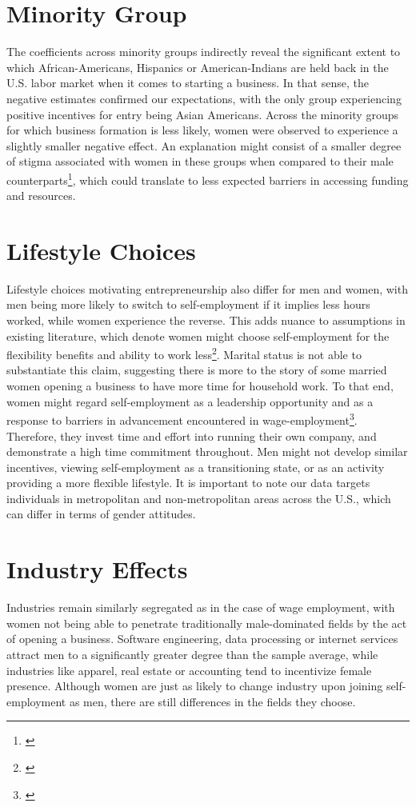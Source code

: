 \section{Minority Group}

The coefficients across minority groups indirectly reveal the significant extent to which African-Americans, Hispanics or American-Indians are held back in the U.S. labor market when it comes to starting a business. In that sense, the negative estimates confirmed our expectations, with the only group experiencing positive incentives for entry being Asian Americans. Across the minority groups for which business formation is less likely, women were observed to experience a slightly smaller negative effect. An explanation might consist of a smaller degree of stigma associated with women in these groups when compared to their male counterparts\footnote{\cite{AlbaRumbautMarotz2005}}, which could translate to less expected barriers in accessing funding and resources. 

\section{Lifestyle Choices}
Lifestyle choices motivating entrepreneurship also differ for men and women, with men being more likely to switch to self-employment if it implies less hours worked, while women experience the reverse. This adds nuance to assumptions in existing literature, which denote women might choose self-employment for the flexibility benefits and ability to work less\footnote{\cite{bertrand2013gender}}. Marital status is not able to substantiate this claim, suggesting there is more to the story of some married women opening a business to have more time for household work. To that end, women might regard self-employment as a leadership opportunity and as a response to barriers in advancement encountered in wage-employment\footnote{\cite{olivetti2016dp11034}}. Therefore, they invest time and effort into running their own company, and demonstrate a high time commitment throughout. Men might not develop similar incentives, viewing self-employment as a transitioning state, or as an activity providing a more flexible lifestyle. It is important to note our data targets individuals in metropolitan and non-metropolitan areas across the U.S., which can differ in terms of gender attitudes. 


\section{Industry Effects}
Industries remain similarly segregated as in the case of wage employment, with women not being able to penetrate traditionally male-dominated fields by the act of opening a business. Software engineering, data processing or internet services attract men to a significantly greater degree than the sample average, while industries like apparel, real estate or accounting tend to incentivize female presence. Although women are just as likely to change industry upon joining self-employment as men, there are still differences in the fields they choose. 

